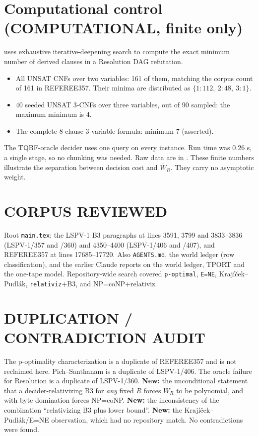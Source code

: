 \documentclass[11pt]{article}
\newcommand{\W}{\overline W}
\begin{document}
\section{Computational control (\textbf{COMPUTATIONAL}, finite only)}
 uses exhaustive
iterative-deepening search to compute the exact minimum number of derived clauses in a Resolution DAG refutation.
\begin{itemize}
\item All UNSAT CNFs over two variables: 161 of them, matching the corpus count of 161 in REFEREE357. Their minima are distributed as $\{1:112,\ 2:48,\ 3:1\}$.
\item 40 seeded UNSAT 3-CNFs over three variables, out of 90 sampled: the maximum minimum is 4.
\item The complete 8-clause 3-variable formula: minimum 7 (asserted).
\end{itemize}
The TQBF-oracle decider uses one query on every instance. Run time was 0.26 s, a single stage, so no chunking was needed.
Raw data are in . These finite numbers illustrate the separation between decision cost and $\W_R$.
They carry no asymptotic weight.

\section*{CORPUS REVIEWED}
Root \texttt{main.tex}: the LSPV-1 B3 paragraphs at lines 3591, 3799 and 3833--3836 (LSPV-1/357 and /360) and 4350--4400 (LSPV-1/406 and /407), and REFEREE357 at lines 17685--17720.
Also \texttt{AGENTS.md}, the world ledger (row classification), and the earlier Claude reports on the world ledger, TPORT and the one-tape model.
Repository-wide search covered \texttt{p-optimal}, \texttt{E=NE}, Krajíček--Pudlák, \texttt{relativiz}+B3, and NP=coNP+relativiz.

\section*{DUPLICATION / CONTRADICTION AUDIT}
The p-optimality characterization is a duplicate of REFEREE357 and is not reclaimed here. Pich--Santhanam is a duplicate of LSPV-1/406.
The oracle failure for Resolution is a duplicate of LSPV-1/360.
\textbf{New:} the unconditional statement that a decider-relativizing B3 for \emph{any} fixed $R$ forces $\W_R$ to be polynomial, and with byte domination forces NP=coNP.
\textbf{New:} the inconsistency of the combination ``relativizing B3 plus lower bound''.
\textbf{New:} the Krajíček--Pudlák/E=NE observation, which had no repository match.
No contradictions were found.
\end{document}
